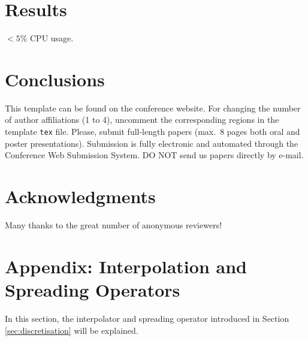 \documentclass[twoside,a4paper]{article}
\begin{document}
\section{Results}\label{sec:results}
 $<5\%$ CPU usage. 
\section{Conclusions}\label{sec:conclusion}
This template can be found on the conference website.
For changing the number of author affiliations (1 to 4), uncomment the corresponding regions in the template \texttt{tex} file.
Please, submit full-length papers (max.~8 pages both oral and poster presentations).
Submission is fully electronic and automated through the Conference Web Submission System.
DO NOT send us papers directly by e-mail.

\section{Acknowledgments}
Many thanks to the great number of anonymous reviewers!

\nocite{*}


\section{Appendix: Interpolation and Spreading Operators}
\label{app:interpol}
In this section, the interpolator and spreading operator introduced in Section \ref{sec:discretisation} will be explained.
\end{document}
